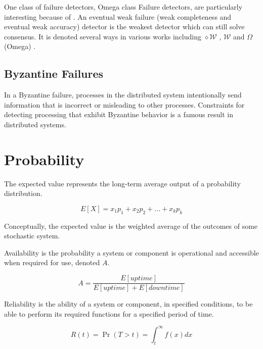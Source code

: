 One class of failure detectors, Omega class Failure detectors, are particularly interesting because of \cite{LEADERELECTIONEVAL}. An eventual weak failure (weak completeness and eventual weak accuracy) detector is the weakest detector which can still solve consensus. It is denoted several ways in various works including $\diamond \mathcal{W}$ \cite{FAILUREDETECTORS}, $\mathcal{W}$ \cite{WEAKESTFAILURE1} \cite{WEAKESTFAILURE2} and $\Omega$ (Omega) \cite{LEADERELECTIONEVAL}.


\subsection{Byzantine Failures}

In a Byzantine failure, processes in the distributed system intentionally send information that is incorrect or misleading to other processes.
Constraints for detecting processing that exhibit Byzantine behavior is a famous result in distributed systems.\cite{byzantine-generals}

\section{Probability}

The expected value represents the long-term average output of a probability distribution.

\begin{equation}E[X] = x_1 p_1 + x_2 p_2 + ... + x_k p_k \end{equation}

Conceptually, the expected value is the weighted average of the outcomes of some stochastic system.

\begin{pdef}
Availability is the probability a system or component is operational and accessible when required for use, denoted $A$.
\end{pdef}

\begin{equation}A = \frac{E[uptime]}{E[uptime]+E[downtime]}\end{equation}

\begin{pdef}
Reliability is the ability of a system or component, in specified conditions, to be able to perform its required functions for a specified period of time.
\end{pdef}

\begin{equation}R(t) = \Pr(T > t) = \int_t^{\infty} f(x) dx\end{equation}

